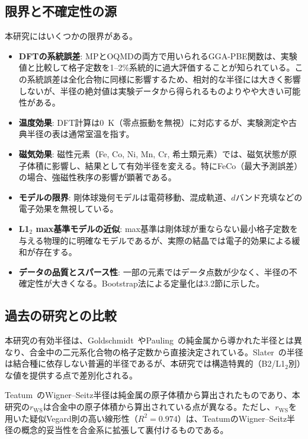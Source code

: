 \documentclass[a4paper,10pt,5p]{elsarticle}
\begin{document}
\subsection{限界と不確定性の源}
本研究にはいくつかの限界がある。
\begin{itemize}
\setlength{\parskip}{0cm}
\setlength{\itemsep}{0cm}
    \item \textbf{DFTの系統誤差}: MPとOQMDの両方で用いられるGGA-PBE関数は、実験値と比較して格子定数を1--2\%系統的に過大評価することが知られている。この系統誤差は全化合物に同様に影響するため、相対的な半径には大きく影響しないが、半径の絶対値は実験データから得られるものよりやや大きい可能性がある。
    \item \textbf{温度効果}: DFT計算は0~K（零点振動を無視）に対応するが、実験測定や古典半径の表は通常室温を指す。
    \item \textbf{磁気効果}: 磁性元素（Fe, Co, Ni, Mn, Cr, 希土類元素）では、磁気状態が原子体積に影響し、結果として有効半径を変える。特にFeCo（最大予測誤差）の場合、強磁性秩序の影響が顕著である。
    \item \textbf{モデルの限界}: 剛体球幾何モデルは電荷移動、混成軌道、$d$バンド充填などの電子効果を無視している。
    \item \textbf{L1$_2$ max基準モデルの近似}: max基準は剛体球が重ならない最小格子定数を与える物理的に明確なモデルであるが、実際の結晶では電子的効果による緩和が存在する。
    \item \textbf{データの品質とスパース性}: 一部の元素ではデータ点数が少なく、半径の不確定性が大きくなる。Bootstrap法による定量化は3.2節に示した。
\end{itemize}


\subsection{過去の研究との比較}
本研究の有効半径は、Goldschmidt~\cite{goldschmidt1927}やPauling~\cite{pauling1947}の純金属から導かれた半径とは異なり、合金中の二元系化合物の格子定数から直接決定されている。Slater~\cite{slater1964atomic}の半径は結合種に依存しない普遍的半径であるが、本研究では構造特異的（B2/L1$_2$別）な値を提供する点で差別化される。

Teatum~\cite{teatum1960}のWigner--Seitz半径は純金属の原子体積から算出されたものであり、本研究の$r_\mathrm{WS}$は合金中の原子体積から算出されている点が異なる。ただし、$r_\mathrm{WS}$を用いた疑似Vegard則の高い線形性（$R^2 = 0.974$）は、TeatumのWigner--Seitz半径の概念的妥当性を合金系に拡張して裏付けるものである。
\end{document}
